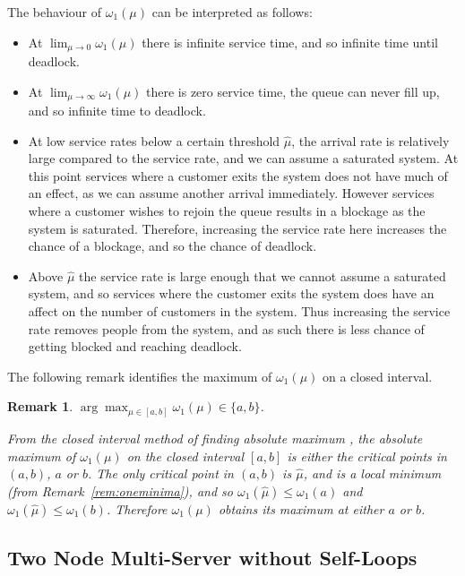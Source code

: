 \documentclass{article}
\newtheorem{remark}{Remark}
\numberwithin{equation}{section}
\begin{document}
The behaviour of $\omega_1(\mu)$ can be interpreted as follows:
\begin{itemize}
\item At $\lim_{\mu \to 0} \omega_1 (\mu)$ there is infinite service time, and so infinite time until deadlock.
\item At $\lim_{\mu \to \infty} \omega_1 (\mu)$ there is zero service time, the queue can never fill up, and so infinite time to deadlock.
\item At low service rates below a certain threshold $\hat{\mu}$, the arrival rate is relatively large compared to the service rate, and we can assume a saturated system.
At this point services where a customer exits the system does not have much of an effect, as we can assume another arrival immediately.
However services where a customer wishes to rejoin the queue results in a blockage as the system is saturated.
Therefore, increasing the service rate here increases the chance of a blockage, and so the chance of deadlock.
\item Above $\hat{\mu}$ the service rate is large enough that we cannot assume a saturated system, and so services where the customer exits the system does have an affect on the number of customers in the system.
Thus increasing the service rate removes people from the system, and as such there is less chance of getting blocked and reaching deadlock.
\end{itemize}

The following remark identifies the maximum of $\omega_1(\mu)$ on a closed interval.\\

\begin{remark}\label{rem:findmaximum}
$\arg\max_{\mu \in [a, b]} \omega_1(\mu) \in \{a, b\}$.

From the closed interval method of finding absolute maximum \cite{tan09}, the absolute maximum of $\omega_1(\mu)$ on the closed interval $[a, b]$ is either the critical points in $(a, b)$, $a$ or $b$.
The only critical point in $(a, b)$ is $\hat{\mu}$, and is a local minimum (from Remark~\ref{rem:oneminima}), and so $\omega_1(\hat{\mu}) \leq \omega_1(a)$ and $\omega_1(\hat{\mu}) \leq \omega_1(b)$.
Therefore $\omega_1(\mu)$ obtains its maximum at either $a$ or $b$.
\end{remark}


\subsection{Two Node Multi-Server without Self-Loops}\label{sec:2nodeMS}
\end{document}
